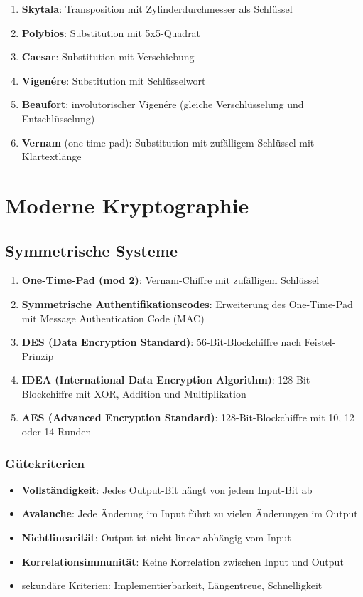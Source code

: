\documentclass{article}
\begin{document}
\begin{enumerate}
  \item \textbf{Skytala}: Transposition mit Zylinderdurchmesser als Schlüssel
  \item \textbf{Polybios}: Substitution mit 5x5-Quadrat
  \item \textbf{Caesar}: Substitution mit Verschiebung
  \item \textbf{Vigenére}: Substitution mit Schlüsselwort
  \item \textbf{Beaufort}: involutorischer Vigenére (gleiche Verschlüsselung und Entschlüsselung)
  \item \textbf{Vernam} (one-time pad): Substitution mit zufälligem Schlüssel mit Klartextlänge
\end{enumerate}


\section{Moderne Kryptographie}

\subsection{Symmetrische Systeme}
\begin{enumerate}
  \item \textbf{One-Time-Pad (mod 2)}: Vernam-Chiffre mit zufälligem Schlüssel
  \item \textbf{Symmetrische Authentifikationscodes}: Erweiterung des One-Time-Pad mit Message Authentication Code (MAC)
  \item \textbf{DES (Data Encryption Standard)}: 56-Bit-Blockchiffre nach Feistel-Prinzip
  \item \textbf{IDEA (International Data Encryption Algorithm)}: 128-Bit-Blockchiffre mit XOR, Addition und Multiplikation
  \item \textbf{AES (Advanced Encryption Standard)}: 128-Bit-Blockchiffre mit 10, 12 oder 14 Runden
\end{enumerate}

\subsubsection{Gütekriterien}
\begin{itemize}
  \item \textbf{Vollständigkeit}: Jedes Output-Bit hängt von jedem Input-Bit ab
  \item \textbf{Avalanche}: Jede Änderung im Input führt zu vielen Änderungen im Output
  \item \textbf{Nichtlinearität}: Output ist nicht linear abhängig vom Input
  \item \textbf{Korrelationsimmunität}: Keine Korrelation zwischen Input und Output
  \item sekundäre Kriterien: Implementierbarkeit, Längentreue, Schnelligkeit
\end{itemize}
\end{document}
